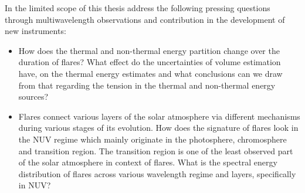 In the limited scope of this thesis address the following pressing questions through multiwavelength observations and contribution in the development of new instruments:
\begin{itemize}
\item How does the thermal and non-thermal energy partition change over the duration of flares? What effect do the uncertainties of volume estimation have, on the thermal energy estimates and what conclusions can we draw from that regarding the tension in the thermal and non-thermal energy sources?

\item Flares connect various layers of the solar atmosphere via different mechanisms during various stages of its evolution. How does the signature of flares look in the NUV regime which mainly originate in the photosphere, chromosphere and transition region. The transition region is one of the least observed part of the solar atmosphere in context of flares. What is the spectral energy distribution of flares across various wavelength regime and layers, specifically in NUV?
\end{itemize}


